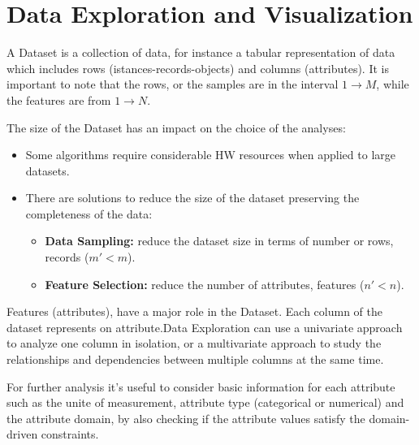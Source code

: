 \chapter{Data Exploration and Visualization}
A Dataset is a collection of data, for instance a tabular representation of data which includes rows (istances-records-objects) and columns (attributes). It is important to note that the rows, or the samples are in the interval $1 \rightarrow M$, while the features are from $1 \rightarrow N$. 

The size of the Dataset has an impact on the choice of the analyses:
\begin{itemize}
    \item Some algorithms require considerable HW resources when applied to large datasets.
    \item There are solutions to reduce the size of the dataset preserving the completeness of the data:
    \begin{itemize}
        \item \textbf{Data Sampling:} reduce the dataset size in terms of number or rows, records ($m' < m$).
        \item \textbf{Feature Selection:} reduce the number of attributes, features ($n' < n$).
    \end{itemize}
\end{itemize}

Features (attributes), have a major role in the Dataset. Each column of the dataset represents on attribute.Data Exploration can use a univariate approach to analyze one column in isolation, or a multivariate approach to study the relationships and dependencies between multiple columns at the same time. 

For further analysis it's useful to consider basic information for each attribute such as the unite of measurement, attribute type (categorical or numerical) and the attribute domain, by also checking if the attribute values satisfy the domain-driven constraints.

